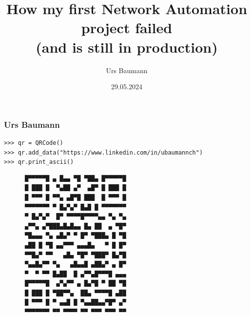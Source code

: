 \documentclass[aspectratio=169]{beamer}
\title[How my first Network Automation project failed (and is still in production)]{How my first Network Automation project failed \\ (and is still in production)}
\author{Urs Baumann}
\institute{Swisscom}
\date{29.05.2024}
\begin{document}
\frame{\titlepage}



\begin{frame}[fragile]
  \frametitle{Urs Baumann}

  \begin{verbatim}
>>> qr = QRCode()
>>> qr.add_data("https://www.linkedin.com/in/ubaumannch")
>>> qr.print_ascii()
  \end{verbatim}
  \begin{verbatim}
      █▀▀▀▀▀█ ▄ █▄▄ ▀█ ▀██▄ █▀▀▀▀▀█
      █ ███ █  ▀▄██ ▄▀  ▄█▀ █ ███ █
      █ ▀▀▀ █ ▀▀▄ ▄█▀█ ███  █ ▀▀▀ █
      ▀▀▀▀▀▀▀ ▀ █▄▀▄▀ █▄█ █ ▀▀▀▀▀▀▀
      ▀ █▄▀▄▀  █▀ ▀▀▀▀█▀▀▀▀▄▄ ▀▄ ▀▄
      ▄▀▀▄ ▄▀███▄█▄█▄▄ █▄ ██  ▄ ▀█▀
      ▀█▄▄▄ ▀▄ ▄█▄▀ ▀ █▀ ▀███▄ █ ▀█
      ▄██ █ ▀█ ▄▄▀▀▀ ▄▄▄█▄   ▀ █ █▀
      ▀▀█▄▀ ▀▀   ▄█▄ ▀█▀ ▀███▀ █▄▀█
      ▀▄▄█▄▀▀ ▀▄   ▄█▄▄█ ▄██▄▀ ▄ █▀
      ▀  ▀ ▀▀ █▄██  █ ▄▀▀▄█▀▀▀█ ▄▄▄
      █▀▀▀▀▀█  ▄▀▄▀▀ ▄ █▄▀█ ▀ ██ ▀█
      █ ███ █ ▀██▀▀▄  ██▄ ▀▀▀▀█ ▄██
      █ ▀▀▀ █ ▀ ▄▄█ █ ▀▄▄██▄▄▀█▀ ▄▀
      ▀▀▀▀▀▀▀ ▀▀ ▀▀▀▀ ▀▀ ▀▀▀ ▀▀▀ ▀▀
  \end{verbatim}
\end{frame}



\end{document}
